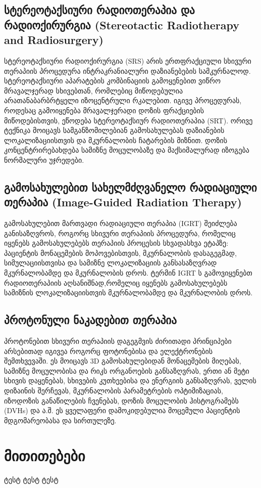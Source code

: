 \documentclass[12pt,a4paper,]{report}
\begin{document}
\section{სტერეოტაქსიური რადიოთერაპია და რადიოქირურგია (Stereotactic Radiotherapy and Radiosurgery)}
სტერეოტაქსიური რადიოქირურგია (SRS) არის ერთფრაქციული სხივური თერაპიის პროცედურა ინტრაკრანიალური დაზიანებების სამკურნალოდ. სტერეოტაქსიური აპარატების კომბინაციის გამოყენებით  ვიწრო მრავალჯერად სხივებთან, რომლებიც მიწოდებულია არათანაბარბრტყელი იზოცენტრული რკალებით. იგივე პროცედურას, როდესაც გამოიყენება მრავალჯერადი დოზის ფრაქციების მიწოდებისთვის, ეწოდება სტერეოტაქსიურ რადიოთერაპია (SRT). ორივე ტექნიკა მოიცავს სამგანზომილებიან გამოსახულებას დაზიანების ლოკალიზაციისთვის და მკურნალობის ჩატარების მიზნით. დოზის კონცენტრირებახდება სამიზნე მოცულობაზე და მაქსიმალურად იზოგება ნორმალური უჯრედები.

\section{გამოსახულებით სახელმძღვანელო რადიაციული თერაპია (Image-Guided Radiation Therapy)}
გამოსახულებით მართვადი რადიაციული თერაპია (IGRT)  შეიძლება განისაზღვროს, როგორც სხივური თერაპიის პროცედურა, რომელიც იყენებს გამოსახულებებს თერაპიის პროცესის სხვადასხვა ეტაპზე: პაციენტის მონაცემების მოპოვებისთვის, მკურნალობის დასაგეგმად, სიმულაციისთვისა და სამიზნე ლოკალიზაციის განსასაზღვრად მკურნალობამდე და მკურნალობის დროს. ტერმინ IGRT ს გამოვიყენებთ რადიოთერაპიის აღსანიშნად,რომელიც იყენებს გამოსახულებებს სამიზნის ლოკალიზაციისთვის მკურნალობამდე და მკურნალობის დროს.

\section{პროტონული ნაკადებით თერაპია}
პროტონებით სხივური თერაპიის დაგეგმვის ძირითადი პრინციპები არსებითად იგივეა როგორც ფოტონებისა და ელექტრონების შემთხვევაში. ეს მოიცავს 3D გამოსახულებიდან მონაცემების მიღებას, სამიზნე მოცულობისა და რიკს ორგანოების განსაზღვრას, ერთი ან მეტი სხივის დაყენებას, სხივების კუთხეებისა და ენერგიის განსაზღვრას, ველის დიზაინის შერჩევას, მკურნალობის პარამეტრების ოპტიმიზაციას, იზოდოზის განაწილების ჩვენებას, დოზის მოცულობის ჰისტოგრამებს (DVHs)  და ა.შ. ეს ყველაფერი დამოკიდებულია მოცემული პაციენტის მდგომარეობასა და სირთულეზე.
\medskip


\chapter{მითითებები}
ტესტ ტესტ ტესტ
 
\end{document}
